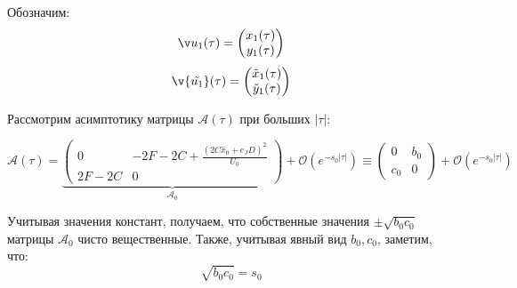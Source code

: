 


Обозначим:
$$\v u_1(\tau) = \begin{pmatrix} x_1(\tau) \\ y_1(\tau) \end{pmatrix}$$
$$\v{ \tilde{u_1}}(\tau) = \begin{pmatrix} \tilde x_1(\tau) \\ \tilde y_1(\tau) \end{pmatrix}$$

Рассмотрим асимптотику матрицы $\mathcal{A}(\tau)$ при больших $|\tau|$:

\begin{equation}
\mathcal{A}(\tau) = \underbrace{\begin{pmatrix} 
0 & -2F-2C + \frac{(2C \hat x_0 + e_J D)^2}{U_0}\\
2F-2C & 0
\end{pmatrix}}_{\mathcal{A}_0} + \mathcal{O}(e^{-s_0 |\tau|}) \equiv 
\begin{pmatrix} 
0 & b_0\\
c_0 & 0
\end{pmatrix} + \mathcal{O}(e^{-s_0 |\tau|})
\end{equation}

Учитывая значения констант, получаем, что собственные значения $\pm \sqrt{b_0 c_0}$ матрицы $\mathcal{A}_0$ чисто вещественные. Также, учитывая явный вид $b_0,c_0$, заметим, что:
$$\sqrt{b_0 c_0} = s_0$$

